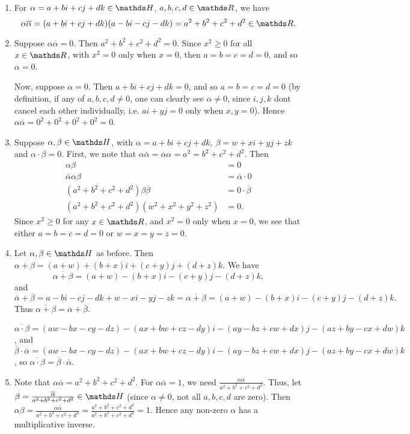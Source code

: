 \documentclass{homework}
\begin{document}
\begin{solution}
  \begin{enumerate}[label=(\alph*)]
    \item For $\alpha=a+bi+cj+dk\in \HH$, $a,b,c,d\in \R$, we have \[
        \alpha\overline{\alpha}=(a+bi+cj+dk)(a-bi-cj-dk)=a^2+b^2+c^2+d^2\in \R
      .\] 
    \item Suppose $\alpha\overline{\alpha}=0$. Then $a^2+b^2+c^2+d^2=0$. Since $x^2\ge 0$ for all
      $x\in \R$, with $x^2=0$ only when $x=0$, then $a=b=c=d=0$, and so $\alpha=0$.

      Now, suppose $\alpha=0$. Then $a+bi+cj+dk=0$, and so $a=b=c=d=0$ (by definition, if any of
      $a,b,c,d\neq 0$, one can clearly see $\alpha\neq 0$, since $i,j,k$ dont cancel each other
      individually, i.e. $ai+yj=0$ only when $x,y=0$). Hence $
      \alpha\overline{\alpha}=0^2+0^2+0^2+0^2=0$.
    \item Suppose $ \alpha,\beta\in \HH$, with $\alpha=a+bi+cj+dk,\ \beta=w+xi+yj+zk$ and
      $\alpha\cdot \beta=0$. First, we
      note that $\alpha\overline{\alpha}=\overline{\alpha}\alpha=a^2=b^2+c^2+d^2$. Then
      \begin{align*}
        \alpha\beta&= 0 \\
        \overline{\alpha}\alpha\beta&=\overline{\alpha} \cdot 0\\
        (a^2+b^2+c^2+d^2)\beta\overline{\beta}&= 0\cdot\overline{\beta}  \\
        (a^2+b^2+c^2+d^2)(w^2+x^2+y^2+z^2)&=0
      .\end{align*} Since $x^2\ge 0$ for any $x\in \R$, and $x^2=0$ only when $x=0$, we see that
      either $a=b=c=d=0$ or $w=x=y=z=0$.
    \item Let $\alpha,\beta\in \HH$ as before. Then $\alpha+\beta=(a+w)+(b+x)i+(c+y)j+(d+z)k$. We
      have \[
        \overline{\alpha+\beta}=(a+w)-(b+x)i-(c+y)j-(d+z)k
      ,\] and \[
      \overline{\alpha}+\overline{\beta}=a-bi-cj-dk+w-xi-yj-zk=
        \overline{\alpha+\beta}=(a+w)-(b+x)i-(c+y)j-(d+z)k
      .\] Thus $ \overline{\alpha+\beta}=\overline{\alpha}+\overline{\beta}$.

      $\overline{\alpha\cdot \beta}=(aw-bx-cy-dz)-(ax+bw+cz-dy)i-(ay-bz+cw+dx)j-(az+by-cx+dw)k$, and
      $\overline{\beta}\cdot
      \overline{\alpha}=(aw-bx-cy-dz)-(ax+bw+cz-dy)i-(ay-bz+cw+dx)j-(az+by-cx+dw)k$, so
      $\overline{\alpha\cdot \beta}=\overline{\beta}\cdot \overline{\alpha}$.

    \item Note that $\alpha\overline{\alpha}=a^2+b^2+c^2+d^2$. For $\alpha\overline{\alpha}=1$,
      we need $\frac{\alpha\overline{\alpha}}{a^2+b^2+c^2+d^2}$. Thus, let
      $\beta=\frac{\overline{\alpha}}{a^2+b^2+c^2+d^2}\in \HH$ (since $\alpha\neq 0$, not all
      $a,b,c,d$ are zero). Then
      $\alpha\beta=\frac{\alpha\overline{\alpha}}{a^2+b^2+c^2+d^2}=\frac{a^2+b^2+c^2+d^2}{a^2+b^2+c^2+d^2}=1$.
      Hence any non-zero $\alpha$ has a multiplicative inverse.
  \end{enumerate}
\end{solution}
\end{document}
